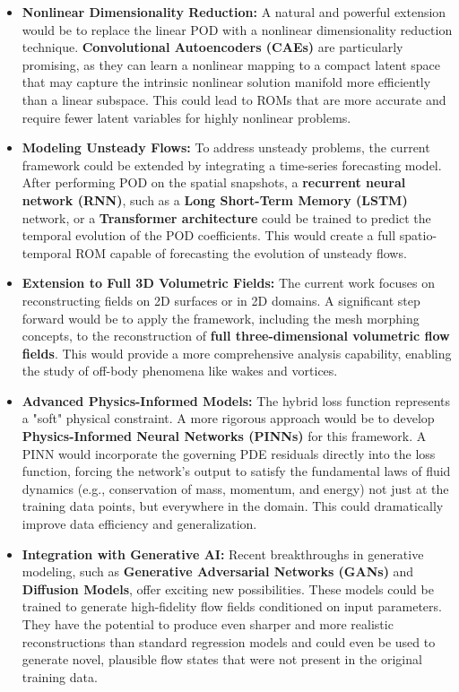 \documentclass[dsc, EN]{ufabcFHZh}
\begin{document}
\begin{itemize}
    \item \textbf{Nonlinear Dimensionality Reduction:} A natural and powerful extension would be to replace the linear POD with a nonlinear dimensionality reduction technique. \textbf{Convolutional Autoencoders (CAEs)} are particularly promising, as they can learn a nonlinear mapping to a compact latent space that may capture the intrinsic nonlinear solution manifold more efficiently than a linear subspace. This could lead to ROMs that are more accurate and require fewer latent variables for highly nonlinear problems.

    \item \textbf{Modeling Unsteady Flows:} To address unsteady problems, the current framework could be extended by integrating a time-series forecasting model. After performing POD on the spatial snapshots, a \textbf{recurrent neural network (RNN)}, such as a \textbf{Long Short-Term Memory (LSTM)} network, or a \textbf{Transformer architecture} could be trained to predict the temporal evolution of the POD coefficients. This would create a full spatio-temporal ROM capable of forecasting the evolution of unsteady flows.

    \item \textbf{Extension to Full 3D Volumetric Fields:} The current work focuses on reconstructing fields on 2D surfaces or in 2D domains. A significant step forward would be to apply the framework, including the mesh morphing concepts, to the reconstruction of \textbf{full three-dimensional volumetric flow fields}. This would provide a more comprehensive analysis capability, enabling the study of off-body phenomena like wakes and vortices.

    \item \textbf{Advanced Physics-Informed Models:} The hybrid loss function represents a "soft" physical constraint. A more rigorous approach would be to develop \textbf{Physics-Informed Neural Networks (PINNs)} for this framework. A PINN would incorporate the governing PDE residuals directly into the loss function, forcing the network's output to satisfy the fundamental laws of fluid dynamics (e.g., conservation of mass, momentum, and energy) not just at the training data points, but everywhere in the domain. This could dramatically improve data efficiency and generalization.

    \item \textbf{Integration with Generative AI:} Recent breakthroughs in generative modeling, such as \textbf{Generative Adversarial Networks (GANs)} and \textbf{Diffusion Models}, offer exciting new possibilities. These models could be trained to generate high-fidelity flow fields conditioned on input parameters. They have the potential to produce even sharper and more realistic reconstructions than standard regression models and could even be used to generate novel, plausible flow states that were not present in the original training data.
\end{itemize}
\end{document}

